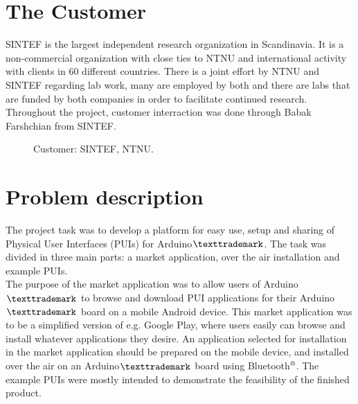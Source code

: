 \section{The Customer}
SINTEF is the largest independent research organization in Scandinavia. It is a non-commercial organization with close ties to NTNU and international activity with clients in 60 different countries. There is a joint effort by NTNU and SINTEF regarding lab work, many are employed by both and there are labs that are funded by both companies in order to facilitate continued research. \\
\newline
Throughout the project, customer interraction was done through Babak Farshchian from SINTEF.\\
\begin{figure}[H]
%
\hfill
{}%
\caption{Customer: \protect{\ref{fig:sintef}} SINTEF, \protect{\ref{fig:ntnu}} NTNU.}
\end{figure}

\section{Problem description}
The project task was to develop a platform for easy use, setup and sharing of Physical User Interfaces (PUIs) for Arduino$\texttrademark$. The task was divided in three main parts: a market application, over the air installation and example PUIs.\\
\newline
The purpose of the market application was to allow users of Arduino$\texttrademark$ to browse and download PUI applications for their Arduino$\texttrademark$ board on a mobile Android device. This market application was to be a simplified version of e.g. Google Play, where users easily can browse and install whatever applications they desire. An application selected for installation in the market application should be prepared on the mobile device, and installed over the air on an Arduino$\texttrademark$ board using Bluetooth$\textsuperscript{\textregistered}$. The example PUIs were mostly intended to demonstrate the feasibility of the finished product.

